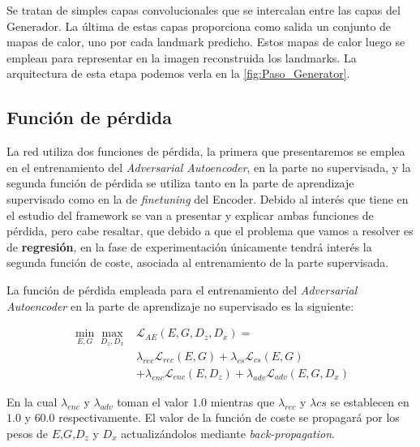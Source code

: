                 \medskip
                
                \noindent Se tratan de simples capas convolucionales que se intercalan entre las capas del Generador. La última de estas capas proporciona como salida un conjunto de mapas de calor, uno por cada landmark predicho. Estos mapas de calor luego se emplean para representar en la imagen reconstruida los landmarks. La arquitectura de esta etapa podemos verla en la \autoref{fig:Paso_Generator}.
            
        \subsection{Función de pérdida}

            \noindent La red utiliza dos funciones de pérdida, la primera que presentaremos se emplea en el entrenamiento del \textit{Adversarial Autoencoder}, en la parte no supervisada, y la segunda función de pérdida se utiliza tanto en la parte de aprendizaje supervisado como en la de \textit{finetuning} del Encoder. Debido al interés que tiene en el estudio del framework se van a presentar y explicar ambas funciones de pérdida, pero cabe resaltar, que debido a que el problema que vamos a resolver es de \textbf{regresión}, en la fase de experimentación únicamente tendrá interés la segunda función de coste, asociada al entrenamiento de la parte supervisada.

            \medskip

            \noindent La función de pérdida empleada para el entrenamiento del \textit{Adversarial Autoencoder} en la parte de aprendizaje no supervisado es la siguiente: 
            
            \begin{align*}
                \min_{E,G} \max_{D_z,D_x} & \mathcal{L}_{AE}(E,G,D_z,D_x) = \\
                & \lambda_{rec} \mathcal{L}_{rec}(E,G) + \lambda_{cs}\mathcal{L}_{cs}(E,G) \\
                & + \lambda_{enc}\mathcal{L}_{enc}(E,D_z)+ \lambda_{adv} \mathcal{L}_{adv}(E,G,D_x)
            \end{align*}

            \noindent En la cual $\lambda_{enc}$ y $\lambda_{adv}$ toman el valor $1.0$ mientras que $\lambda_{rec}$ y $\lambda{cs}$ se establecen en $1.0$ y $60.0$ respectivamente. El valor de la función de coste se propagará por los pesos de $E$,$G$,$D_z$ y $D_x$ actualizándolos mediante \textit{back-propagation}. 


